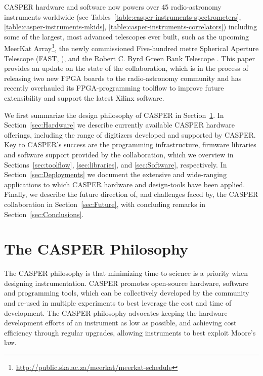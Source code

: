 \documentclass{ws-jai}
\begin{document}
CASPER hardware and software now powers over 45 radio-astronomy
instruments worldwide (see Tables~\ref{table:casper-instruments-spectrometers},
\ref{table:casper-instruments-mkids},
\ref{table:casper-instruments-correlators}) including some of the largest, most
advanced telescopes ever built, such as the upcoming MeerKat
Array\footnote{\url{http://public.ska.ac.za/meerkat/meerkat-schedule}}, the
newly commissioned Five-hundred metre Spherical Aperture Telescope (FAST,
\citet{fast}), and the Robert C. Byrd Green Bank Telescope \citep{vegas}. This paper
provides an update on the state of the collaboration, which is in the process of releasing
two new FPGA boards to the radio-astronomy community and has recently overhauled
its FPGA-programming toolflow to improve future extensibility and support the latest Xilinx software.

We first summarize the design philosophy of CASPER in
Section~\ref{sec:CASPER-philosophy}.  In Section~\ref{sec:Hardware} we describe
currently available CASPER hardware offerings, including the range of
digitizers developed and supported by CASPER. Key to CASPER's success are the
programming infrastructure, firmware libraries and software support provided by the
collaboration, which we overview in Sections~\ref{sec:toolflow}, \ref{sec:libraries}, and \ref{sec:Software}, respectively.  In
Section~\ref{sec:Deployments} we document the extensive and wide-ranging
applications to which CASPER hardware and design-tools have been applied.
Finally, we describe the future direction of, and challenges faced by, the CASPER
collaboration in Section~\ref{sec:Future}, with concluding remarks in
Section~\ref{sec:Conclusions}.

\section{The CASPER Philosophy} \label{sec:CASPER-philosophy}

The CASPER philosophy is that minimizing time-to-science is a priority when designing instrumentation. CASPER promotes open-source hardware, software and programming tools, which can be collectively developed by the community and re-used in multiple experiments to best leverage the cost and time of development.
The CASPER philosophy advocates keeping the hardware development efforts of an instrument as low as possible, and achieving cost efficiency through regular upgrades, allowing instruments to best exploit Moore's law.
\end{document}
